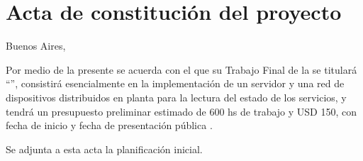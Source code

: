 \documentclass[
11pt%
]{charter}
\begin{document}
\section*{Acta de constitución del proyecto}
\label{sec:acta}

\begin{flushright}
Buenos Aires, \fechaInicioName
\end{flushright}

\vspace{2cm}

Por medio de la presente se acuerda con el  \authorname\hspace{1px} que su Trabajo Final de la \degreename\hspace{1px} se titulará ``\ttitle'', consistirá esencialmente en {la implementación de un servidor y una red de dispositivos distribuidos en planta para la lectura del estado de los servicios}, y tendrá un presupuesto preliminar estimado de {600} hs de trabajo y {USD 150}, con fecha de inicio \fechaInicioName\hspace{1px} y fecha de presentación pública \fechaFinalName.

Se adjunta a esta acta la planificación inicial.

\vfill
\end{document}
